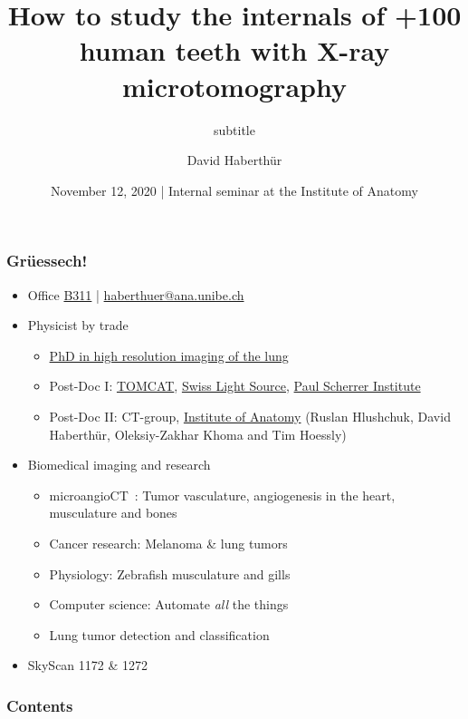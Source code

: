 \documentclass[aspectratio=169]{beamer}
\title{How to study the internals of +100 human teeth with X-ray microtomography}
\subtitle{subtitle}
\author{David Haberthür}
\date{November 12, 2020 | Internal seminar at the Institute of Anatomy}
\newcommand{\uct}{\si{\micro}CT\xspace}%
\begin{document}
{%
	\begin{frame}%
		\maketitle
	\end{frame}%
}

\begin{frame}[label=currentasdf]
	\frametitle{Grüessech!}
	\begin{itemize}
		\item Office \href{http://osm.org/go/0CZwlGp3A?m}{B311} | \href{mailto:haberthuer@ana.unibe.ch?subject=Feedback\%20from\%20the\%20(micro)-tomography\%20lecture}{haberthuer@ana.unibe.ch}
		\item Physicist by trade
		\begin{itemize}
			\item \href{https://boris.unibe.ch/2619/}{PhD in high resolution imaging of the lung}
			\item Post-Doc I: \href{https://www.psi.ch/sls/tomcat/}{TOMCAT}, \href{https://www.psi.ch/sls/}{Swiss Light Source}, \href{https://www.psi.ch/}{Paul Scherrer Institute}
			\item Post-Doc II: \uct-group, \href{https://ana.unibe.ch}{Institute of Anatomy} (Ruslan Hlushchuk, David Haberthür, Oleksiy-Zakhar Khoma and Tim Hoessly)
		\end{itemize}
		\item Biomedical imaging and research
		\begin{itemize}
			\item microangioCT~\cite{Hlushchuk2018}: Tumor vasculature, angiogenesis in the heart, musculature and bones
			\item Cancer research: Melanoma \& lung tumors
			\item Physiology: Zebrafish musculature and gills~\cite{MesserliAaldijk2020}			
			\item Computer science: Automate \emph{all} the things~\cite{Haberthur2020}
			\item Lung tumor detection and classification
		\end{itemize}
	\item<1-> SkyScan 1172 \& 1272 							
	\end{itemize}
\end{frame}

\begin{frame}
	\frametitle{Contents}
	\tableofcontents
\end{frame}
\end{document}
